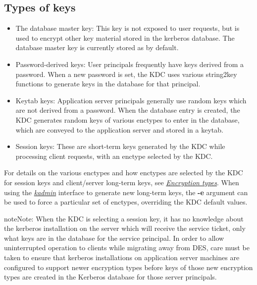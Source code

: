 \documentclass[letterpaper,10pt,english]{sphinxmanual}
\begin{document}
\subsection{Types of keys}
\label{admin/advanced/retiring-des:types-of-keys}\begin{itemize}
\item {} 
The database master key:  This key is not exposed to user requests,
but is used to encrypt other key material stored in the kerberos
database.  The database master key is currently stored as 
by default.

\item {} 
Password-derived keys:  User principals frequently have keys
derived from a password.  When a new password is set, the KDC
uses various string2key functions to generate keys in the database
for that principal.

\item {} 
Keytab keys:  Application server principals generally use random
keys which are not derived from a password.  When the database
entry is created, the KDC generates random keys of various enctypes
to enter in the database, which are conveyed to the application server
and stored in a keytab.

\item {} 
Session keys:  These are short-term keys generated by the KDC while
processing client requests, with an enctype selected by the KDC.

\end{itemize}

For details on the various enctypes and how enctypes are selected by the KDC
for session keys and client/server long-term keys, see {\hyperref[admin/enctypes:enctypes]{\emph{Encryption types}}}.
When using the {\hyperref[admin/admin_commands/kadmin_local:kadmin-1]{\emph{kadmin}}} interface to generate new long-term keys,
the \textbf{-e} argument can be used to force a particular set of enctypes,
overriding the KDC default values.

\begin{notice}{note}{Note:}
When the KDC is selecting a session key, it has no knowledge about the
kerberos installation on the server which will receive the service ticket,
only what keys are in the database for the service principal.
In order to allow uninterrupted operation to
clients while migrating away from DES, care must be taken to ensure that
kerberos installations on application server machines are configured to
support newer encryption types before keys of those new encryption types
are created in the Kerberos database for those server principals.
\end{notice}
\end{document}
